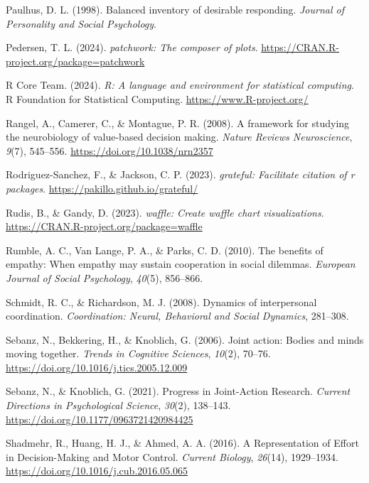 \documentclass[
  man,
  floatsintext,
  longtable,
  nolmodern,
  notxfonts,
  notimes,
  colorlinks=true,linkcolor=blue,citecolor=blue,urlcolor=blue]{apa7}
\newlength{\cslhangindent}
\newenvironment{CSLReferences}[2] %
 {\begin{list}{}{%
  \setlength{\itemindent}{0pt}
  \setlength{\leftmargin}{0pt}
  \setlength{\parsep}{0pt}
  \ifodd #1
   \setlength{\leftmargin}{\cslhangindent}
   \setlength{\itemindent}{-1\cslhangindent}
  \fi
  \setlength{\itemsep}{#2\baselineskip}}}
 {\end{list}}
\begin{document}
\begin{CSLReferences}{1}{0}
Paulhus, D. L. (1998). Balanced inventory of desirable responding.
\emph{Journal of Personality and Social Psychology}.

Pedersen, T. L. (2024). \emph{{patchwork}: The composer of plots}.
\url{https://CRAN.R-project.org/package=patchwork}

R Core Team. (2024). \emph{{R}: A language and environment for
statistical computing}. R Foundation for Statistical Computing.
\url{https://www.R-project.org/}

Rangel, A., Camerer, C., \& Montague, P. R. (2008). A framework for
studying the neurobiology of value-based decision making. \emph{Nature
Reviews Neuroscience}, \emph{9}(7), 545--556.
\url{https://doi.org/10.1038/nrn2357}

Rodriguez-Sanchez, F., \& Jackson, C. P. (2023). \emph{{grateful}:
Facilitate citation of r packages}.
\url{https://pakillo.github.io/grateful/}

Rudis, B., \& Gandy, D. (2023). \emph{{waffle}: Create waffle chart
visualizations}. \url{https://CRAN.R-project.org/package=waffle}

Rumble, A. C., Van Lange, P. A., \& Parks, C. D. (2010). The benefits of
empathy: {When} empathy may sustain cooperation in social dilemmas.
\emph{European Journal of Social Psychology}, \emph{40}(5), 856--866.

Schmidt, R. C., \& Richardson, M. J. (2008). Dynamics of interpersonal
coordination. \emph{Coordination: Neural, Behavioral and Social
Dynamics}, 281--308.

Sebanz, N., Bekkering, H., \& Knoblich, G. (2006). Joint action: Bodies
and minds moving together. \emph{Trends in Cognitive Sciences},
\emph{10}(2), 70--76. \url{https://doi.org/10.1016/j.tics.2005.12.009}

Sebanz, N., \& Knoblich, G. (2021). Progress in {Joint-Action Research}.
\emph{Current Directions in Psychological Science}, \emph{30}(2),
138--143. \url{https://doi.org/10.1177/0963721420984425}

Shadmehr, R., Huang, H. J., \& Ahmed, A. A. (2016). A {Representation}
of {Effort} in {Decision-Making} and {Motor Control}. \emph{Current
Biology}, \emph{26}(14), 1929--1934.
\url{https://doi.org/10.1016/j.cub.2016.05.065}


\end{CSLReferences}
\end{document}

